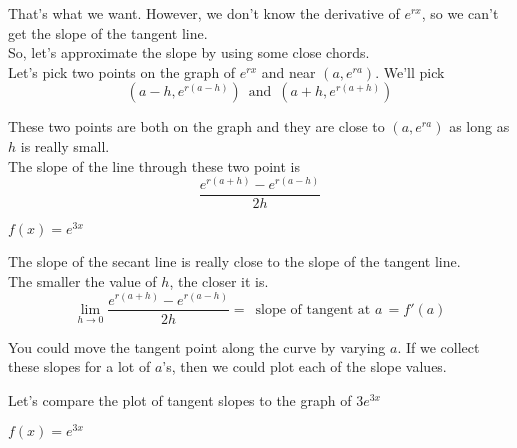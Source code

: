 \documentclass{ximera}
\begin{document}
That's what we want.  However, we don't know the derivative of $e^{r x}$, so we can't get the slope of the tangent line. \\

So, let's approximate the slope by using some close chords. \\



Let's pick two points on the graph of $e^{r x}$ and near $(a, e^{r a})$.  We'll pick
\[
(a-h, e^{r(a-h)}) \, \text{ and } \, (a+h, e^{r(a+h)})
\]

These two points are both on the graph and they are close to $(a, e^{r a})$ as long as $h$ is really small. \\

The slope of the line through these two point is 
\[
\frac{e^{r(a+h)} - e^{r(a-h)}}{2h}
\]




\begin{example}  $f(x) = e^{3 x}$

\begin{center}
\end{center}

\end{example}





The slope of the secant line is really close to the slope of the tangent line. \\

The smaller the value of $h$, the closer it is. \\


\[
\lim_{h \to 0} \frac{e^{r(a+h)} - e^{r(a-h)}}{2h} = \, \text{ slope of tangent at }a \, = f'(a)
\]


You could move the tangent point along the curve by varying $a$.  If we collect these slopes for a lot of $a$'s, then we could plot each of the slope values.

Let's compare the plot of tangent slopes to the graph of $3 e^{3 x}$








\begin{example}  $f(x) = e^{3 x}$

\begin{center}
\end{center}

\end{example}
\end{document}
